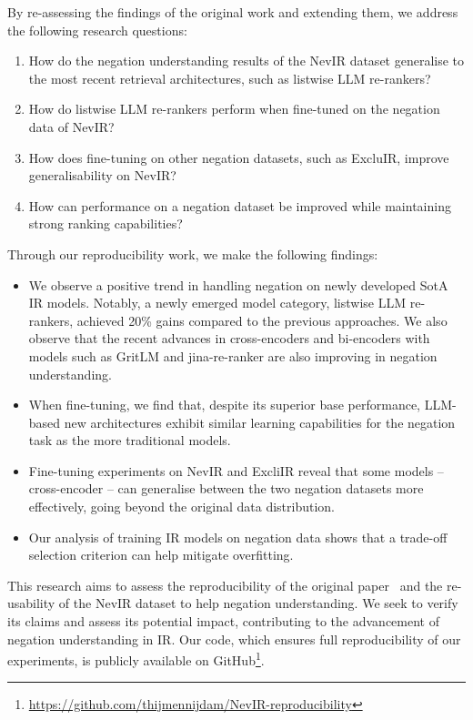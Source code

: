 By re-assessing the findings of the original work and extending them, we address the following research questions:
\begin{enumerate}[label=\textbf{RQ\arabic*}]
    \item How do the negation understanding results of the NevIR dataset generalise to the most recent retrieval architectures, such as listwise LLM re-rankers?
    \item How do listwise LLM re-rankers perform when fine-tuned on the negation data of NevIR?
    \item How does fine-tuning on other negation datasets, such as ExcluIR, improve generalisability on NevIR?
    \item How can performance on a negation dataset be improved while maintaining strong ranking capabilities?
\end{enumerate}


Through our reproducibility work, we make the following findings:
\begin{itemize}[leftmargin=*]
    \item We observe a positive trend in handling negation on newly developed SotA IR models. Notably, a newly emerged model category, listwise LLM re-rankers, achieved 20\% gains compared to the previous approaches. We also observe that the recent advances in cross-encoders and bi-encoders with models such as GritLM and jina-re-ranker are also improving in negation understanding.

    \item When fine-tuning, we find that, despite its superior base performance, LLM-based new architectures exhibit similar learning capabilities for the negation task as the more traditional models.
    
    \item Fine-tuning experiments on NevIR and ExcliIR reveal that some models -- cross-encoder -- can generalise between the two negation datasets more effectively, going beyond the original data distribution. 
    \item Our analysis of training IR models on negation data shows that a trade-off selection criterion can help mitigate overfitting.
\end{itemize}



This research aims to assess the reproducibility of the original paper~\citep{weller2024nevirnegationneuralinformation} and the re-usability of the NevIR dataset to help negation understanding. We seek to verify its claims and assess its potential impact, contributing to the advancement of negation understanding in IR. Our code, which ensures full reproducibility of our experiments, is publicly available on GitHub\footnote{\url{https://github.com/thijmennijdam/NevIR-reproducibility}}.








    






















    
